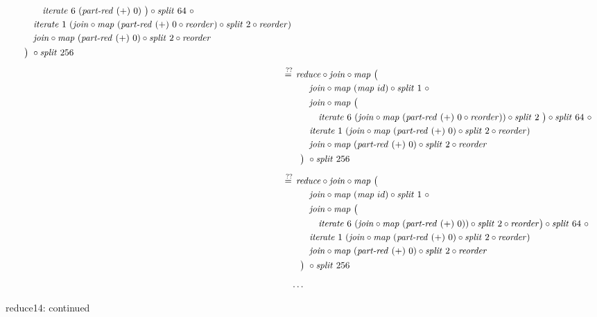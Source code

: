 \begin{figure*}[t]
\begin{align*}
\begin{aligned}
    &\qquad\qquad \iterateN\ 6\ (\partRed\ (+)\ 0)\ \big)\circ \splitN\ 64\ \circ\\
    &\qquad\quad\iterateN\ 1\ (\join \circ \map\ (\partRed\ (+)\ 0\circ \reorder) \circ \splitN\ 2\circ \reorder)\\
    &\qquad\quad\join \circ \map\ (\partRed\ (+)\ 0) \circ \splitN\ 2\circ \reorder\\
    &\qquad\big)\ \circ \splitN\ 256
  \end{aligned}\\[.5em]
%
  &\hspace{-2em}\quad\begin{aligned}
    &\overset{??}{=\hspace{.2em}}
      \reduce \circ \join \circ \map\ \big(\\
    &\qquad\quad\join \circ \map\ (\map\ id) \circ \splitN\ 1\ \circ\\
    &\qquad\quad\join \circ \map\ \big(\\
    &\qquad\qquad \iterateN\ 6\ (\join \circ \map\ (\partRed\ (+)\ 0\circ \reorder))\circ \splitN\ 2\ \big)\circ \splitN\ 64\ \circ\\
    &\qquad\quad\iterateN\ 1\ (\join \circ \map\ (\partRed\ (+)\ 0) \circ \splitN\ 2\circ \reorder)\\
    &\qquad\quad\join \circ \map\ (\partRed\ (+)\ 0) \circ \splitN\ 2\circ \reorder\\
    &\qquad\big)\ \circ \splitN\ 256
  \end{aligned}\\[.5em]
%
  &\hspace{-2em}\quad\begin{aligned}
    &\overset{??}{=\hspace{.2em}}
      \reduce \circ \join \circ \map\ \big(\\
    &\qquad\quad\join \circ \map\ (\map\ id) \circ \splitN\ 1\ \circ\\
    &\qquad\quad\join \circ \map\ \big(\\
    &\qquad\qquad \iterateN\ 6\ (\join \circ \map\ (\partRed\ (+)\ 0))\circ \splitN\ 2\circ \reorder \big)\circ \splitN\ 64\ \circ\\
    &\qquad\quad\iterateN\ 1\ (\join \circ \map\ (\partRed\ (+)\ 0) \circ \splitN\ 2\circ \reorder)\\
    &\qquad\quad\join \circ \map\ (\partRed\ (+)\ 0) \circ \splitN\ 2\circ \reorder\\
    &\qquad\big)\ \circ \splitN\ 256
  \end{aligned}\\[.5em]
%
  &\ldots
\end{align*}
\caption{reduce14: continued}
\end{figure*}


